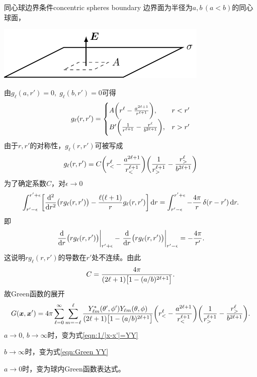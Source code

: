 \begin{example}{同心球边界条件}{concentric spheres boundary}
    边界面为半径为$a,b\,(a<b)$的同心球面，
    \begin{center}
        \includegraphics[page=16]{figures/tikz/layouts.pdf}
    \end{center}
    由$g_\ell(a,r')=0,\;g_\ell(b,r')=0$可得
    \[
        g_\ell(r,r')=
        \begin{cases}
            A\biggkh{r^\ell-\frac{a^{2\ell+1}}{r^{\ell+1}}},&r<r'\\
            B'\biggkh{\frac1{r^{\ell+1}}-\frac{r^\ell}{b^{2\ell+1}}},&r>r'\\
        \end{cases}
    \]
    由于$r,r'$的对称性，$g_\ell(r,r')$可被写成 
    \[
        g_\ell(r,r')=C\biggkh{r_<^\ell-\frac{a^{2\ell+1}}{r_<^{\ell+1}}}\biggkh{\frac1{r_>^{\ell+1}}-\frac{r_>^\ell}{b^{2\ell+1}}}
    \]
    为了确定系数$C$，对$\epsilon\to0$
    \[
        \int_{r'-\epsilon}^{r'+\epsilon}\biggfkh{\dd[2]r\bigkh{rg_\ell(r,r')}-\frac{\ell(\ell+1)}{r}g_\ell(r,r')}\d r=\int_{r'-\epsilon}^{r'+\epsilon}-\frac{4\pi}r\vd(r-r')\d r.
    \]
    即
    \[
        \edg{\dd r\bigkh{rg_\ell(r,r')}}_{r'+\epsilon}-\edg{\dd r\bigkh{rg_\ell(r,r')}}_{r'-\epsilon}=-\frac{4\pi}{r'}.
    \]
    这说明$rg_\ell(r,r')$的导数在$r'$处不连续。由此
    \[
        C=\frac{4\pi}{(2\ell+1)\bigfkh{1-(a/b)^{2\ell+1}}}.
    \]
    故Green函数的展开
    \begin{equation}
        G(\bm x,\bm x')=4\pi\sum_{\ell=0}^\infty\sum_{m=-\ell}^\ell \frac{Y_{\ell m}^\ast(\theta',\phi')Y_{\ell m}(\theta,\phi)}{(2\ell+1)\bigfkh{1-(a/b)^{2\ell+1}}}\biggkh{r_<^\ell-\frac{a^{2\ell+1}}{r_<^{\ell+1}}}\biggkh{\frac1{r_>^{\ell+1}}-\frac{r_>^\ell}{b^{2\ell+1}}}.
    \end{equation}
    \tcblower
    $a\to0,\,b\to\infty$时，变为式\eqref{eqn:1/|x-x'|=YY}

    $b\to\infty$时，变为式\eqref{eqn:Green YY}

    $a\to0$时，变为球内Green函数表达式。
\end{example}
